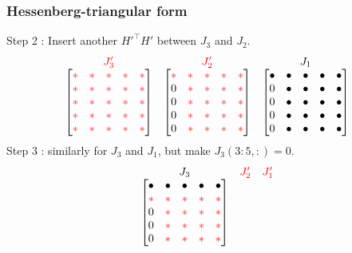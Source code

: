 \begin{frame}
  \frametitle{Hessenberg-triangular form}
  {\color{green} Step 2} : Insert another $H'^\top H'$
  between $J_3$ and $J_2$.
  \[
  \begin{matrix}
    {\color{red} J'_3} & {\color{red} J'_2} & J_1 \\
    \begin{bmatrix}
      \ch & \ch & \ch & \ch & \ch \\
      \ch & \ch & \ch & \ch & \ch \\
      \ch & \ch & \ch & \ch & \ch \\
      \ch & \ch & \ch & \ch & \ch \\
      \ch & \ch & \ch & \ch & \ch \\
    \end{bmatrix}
    &
    \begin{bmatrix}
      \ch & \ch & \ch & \ch & \ch \\
      0 & \ch & \ch & \ch & \ch \\
      0 & \ch & \ch & \ch & \ch \\
      0 & \ch & \ch & \ch & \ch \\
      0 & \ch & \ch & \ch & \ch \\
    \end{bmatrix}
    &
    \begin{bmatrix}
      \uch & \uch & \uch & \uch & \uch \\
      0 & \uch & \uch & \uch & \uch \\
      0 & \uch & \uch & \uch & \uch \\
      0 & \uch & \uch & \uch & \uch \\
      0 & \uch & \uch & \uch & \uch \\
    \end{bmatrix}
  \end{matrix}
  \]
  {\color{green} Step 3} : similarly for $J_3$ and $J_1$, 
  but {\color{green} make $J_3(3:5,:)=0$}. 
  \[
  \begin{matrix}
    J_3 & {\color{red} J'_2} & {\color{red} J'_1} \\
    \begin{bmatrix}
      \uch & \uch & \uch & \uch & \uch \\
      \ch & \ch & \ch & \ch & \ch \\
      0 & \ch & \ch & \ch & \ch \\
      0 & \ch & \ch & \ch & \ch \\
      0 & \ch & \ch & \ch & \ch \\

\end{bmatrix}
\end{matrix}\]
\end{frame}
